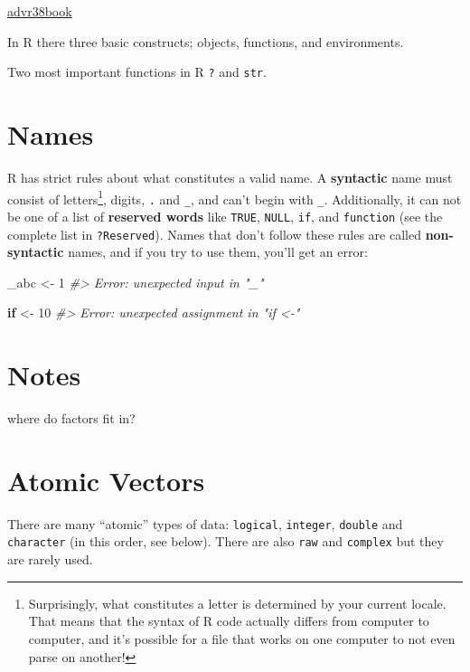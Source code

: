 \documentclass[]{book}
\newenvironment{Shaded}{\begin{snugshade}}{\end{snugshade}}
\newcommand{\DecValTok}[1]{\textcolor[rgb]{0.00,0.00,0.81}{#1}}
\newcommand{\StringTok}[1]{\textcolor[rgb]{0.31,0.60,0.02}{#1}}
\newcommand{\CommentTok}[1]{\textcolor[rgb]{0.56,0.35,0.01}{\textit{#1}}}
\newcommand{\ControlFlowTok}[1]{\textcolor[rgb]{0.13,0.29,0.53}{\textbf{#1}}}
\newcommand{\NormalTok}[1]{#1}
\let\rmarkdownfootnote\footnote%
\def\footnote{\protect\rmarkdownfootnote}
\theoremstyle{definition}
\theoremstyle{definition}
\theoremstyle{definition}
\theoremstyle{remark}
\begin{document}
\href{https://privefl.github.io/advr38book/r-programming.html}{advr38book}

In R there three basic constructs; objects, functions, and environments.

Two most important functions in R \texttt{?} and \texttt{str}.

\section{Names}\label{names}

R has strict rules about what constitutes a valid name. A
\textbf{syntactic} name must consist of letters\footnote{Surprisingly,
  what constitutes a letter is determined by your current locale. That
  means that the syntax of R code actually differs from computer to
  computer, and it's possible for a file that works on one computer to
  not even parse on another!}, digits, \texttt{.} and \texttt{\_}, and
can't begin with \texttt{\_}. Additionally, it can not be one of a list
of \textbf{reserved words} like \texttt{TRUE}, \texttt{NULL},
\texttt{if}, and \texttt{function} (see the complete list in
\texttt{?Reserved}). Names that don't follow these rules are called
\textbf{non-syntactic} names, and if you try to use them, you'll get an
error:

\begin{Shaded}
\begin{Highlighting}[]
\NormalTok{_abc <-}\StringTok{ }\DecValTok{1}
\CommentTok{#> Error: unexpected input in "_"}

\ControlFlowTok{if}\NormalTok{ <-}\StringTok{ }\DecValTok{10}
\CommentTok{#> Error: unexpected assignment in "if <-"}
\end{Highlighting}
\end{Shaded}

\section{Notes}\label{notes}

where do factors fit in?

\section{Atomic Vectors}\label{atomic-vectors}

There are many ``atomic'' types of data: \texttt{logical},
\texttt{integer}, \texttt{double} and \texttt{character} (in this order,
see below). There are also \texttt{raw} and \texttt{complex} but they
are rarely used.
\end{document}

